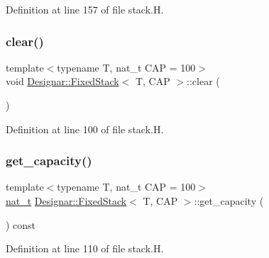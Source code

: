Definition at line 157 of file stack.\+H.

\mbox{\label{class_designar_1_1_fixed_stack_a63b4e0110ee9590eba7b2e776159eb17}} 
\subsubsection{\texorpdfstring{clear()}{clear()}}
{\footnotesize\ttfamily template$<$typename T, nat\+\_\+t C\+AP = 100$>$ \\
void \hyperlink{class_designar_1_1_fixed_stack}{Designar\+::\+Fixed\+Stack}$<$ T, C\+AP $>$\+::clear (\begin{DoxyParamCaption}{ }\end{DoxyParamCaption})\hspace{0.3cm}{\ttfamily [inline]}}



Definition at line 100 of file stack.\+H.

\mbox{\label{class_designar_1_1_fixed_stack_a617775aac061d6a003c7e1638e3e82bb}} 
\subsubsection{\texorpdfstring{get\+\_\+capacity()}{get\_capacity()}}
{\footnotesize\ttfamily template$<$typename T, nat\+\_\+t C\+AP = 100$>$ \\
\hyperlink{namespace_designar_aa72662848b9f4815e7bf31a7cf3e33d1}{nat\+\_\+t} \hyperlink{class_designar_1_1_fixed_stack}{Designar\+::\+Fixed\+Stack}$<$ T, C\+AP $>$\+::get\+\_\+capacity (\begin{DoxyParamCaption}{ }\end{DoxyParamCaption}) const\hspace{0.3cm}{\ttfamily [inline]}}



Definition at line 110 of file stack.\+H.

\mbox{\label{class_designar_1_1_fixed_stack_a59e1c93e8653984ac828840111914982}} 
